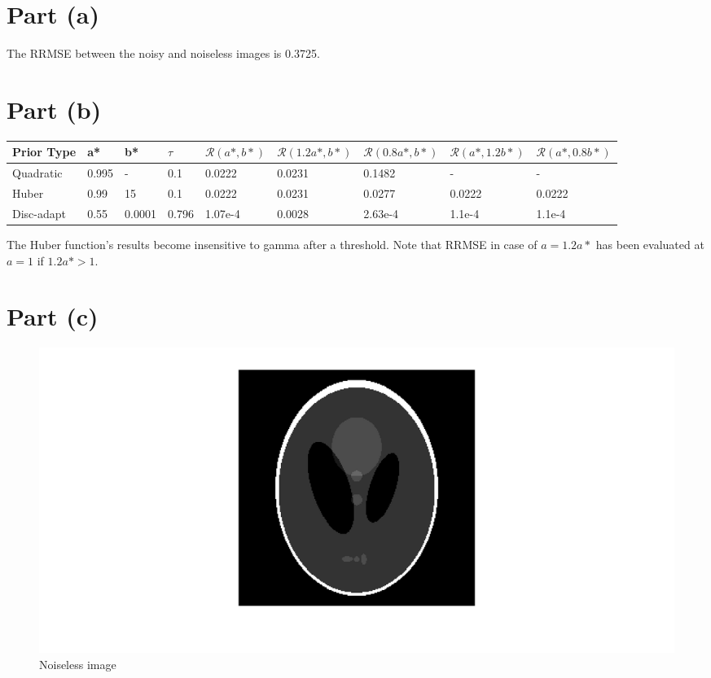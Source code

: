\documentclass[11pt]{article}
\begin{document}
\maketitle
\section*{Part (a)}
The RRMSE between the noisy and noiseless images is 0.3725.

\section*{Part (b)}
\begin{center}
\begin{tabular}{| l | l | l | l | l | l | l | l | l |}
\hline
Prior Type & a* & b* & $\tau$ & $\mathcal{R}(a*, b*)$ & $\mathcal{R}(1.2a*, b*)$ & $\mathcal{R}(0.8a*, b*)$ & $\mathcal{R}(a*, 1.2b*)$ & $\mathcal{R}(a*, 0.8b*)$ \\
\hline
Quadratic & 0.995 & - & 0.1 & 0.0222 & 0.0231 & 0.1482 & - & -\\
\hline
Huber & 0.99 & 15 & 0.1 & 0.0222 & 0.0231 & 0.0277 & 0.0222 & 0.0222\\
\hline
Disc-adapt & 0.55 & 0.0001 & 0.796 & 1.07e-4 & 0.0028 & 2.63e-4 & 1.1e-4 & 1.1e-4\\
\hline
\end{tabular}
\end{center}

\noindent The Huber function's results become insensitive to gamma after a threshold. Note that RRMSE in case of $a=1.2a*$ has been evaluated at $a=1$ if $1.2a* > 1$.

\section*{Part (c)}
\begin{figure}[H]
\caption{Noiseless image}
\begin{center}
\includegraphics[scale=0.5]{imageNoiseless}
\end{center}
\end{figure}
\end{document}
